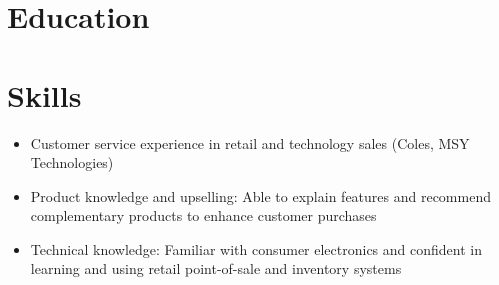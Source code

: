 \documentclass{resume_class}
\begin{document}
\section{Education}

\section{Skills}
\begin{itemize}[leftmargin = 10pt , labelsep = 3pt , parsep = 0pt , itemsep = 2pt] 
	\item Customer service experience in retail and technology sales (Coles, MSY Technologies)
	\item Product knowledge and upselling: Able to explain features and recommend complementary products to enhance customer purchases
	\item Technical knowledge: Familiar with consumer electronics and confident in learning and using retail point-of-sale and inventory systems
\end{itemize}
             
\end{document}
